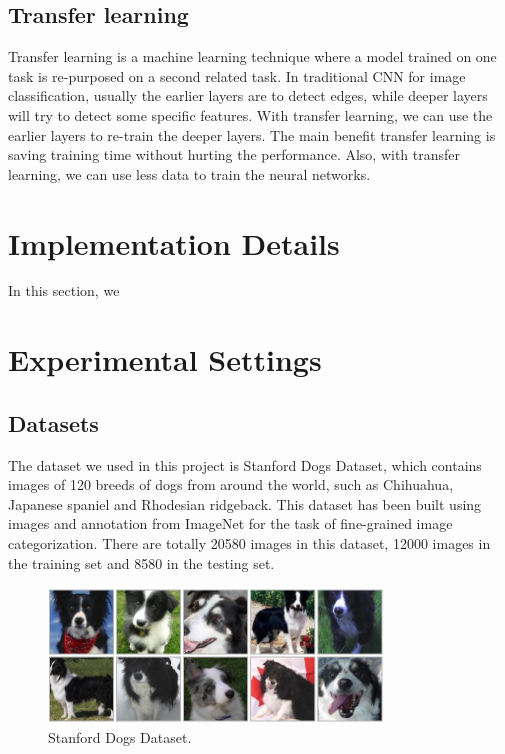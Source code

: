 \documentclass{article}
\begin{document}
\subsection{Transfer learning}

Transfer learning is a machine learning technique where a model trained on one task is re-purposed on a second related task. In traditional CNN for image classification, usually the earlier layers are to detect edges, while deeper layers will try to detect some specific features. With transfer learning, we can use the earlier layers to re-train the deeper layers. The main benefit transfer learning is saving training time without hurting the performance. Also, with transfer learning, we can use less data to train the neural networks. 

\section{Implementation Details}

In this section, we 

\newpage
\section{Experimental Settings}

\subsection{Datasets}

The dataset we used in this project is Stanford Dogs Dataset, which contains images of 120 breeds of dogs from around the world, such as Chihuahua, Japanese spaniel and Rhodesian ridgeback. This dataset has been built using images and annotation from ImageNet for the task of fine-grained image categorization. There are totally 20580 images in this dataset, 12000 images in the training set and 8580 in the testing set.

\begin{figure}[H]
	\centering
	\includegraphics[width=3.5in]{pics/dogs} 
	\caption{Stanford Dogs Dataset.}
\end{figure}
\end{document}
